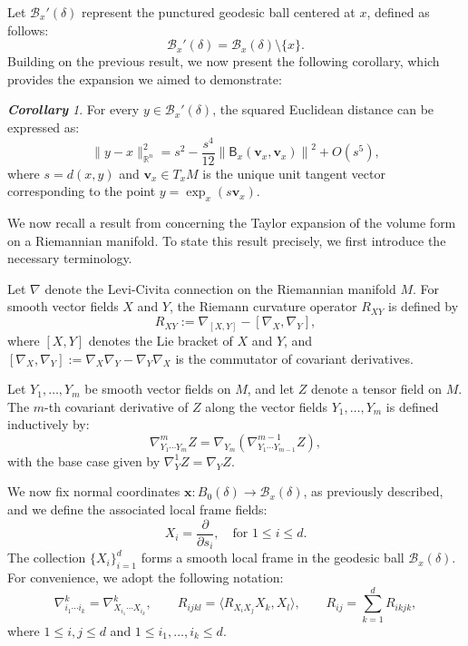 \documentclass{amsart}
\theoremstyle{Theorem}
\theoremstyle{remark}
\newtheorem{cor}{\bf Corollary}[section]
\numberwithin{equation}{section} \numberwithin{figure}{section}
\renewcommand*{\to}{\rightarrow}
\newcommand{\mc}[1]{\mathcal{#1}}
\newcommand{\mf}[1]{\mathbf{#1}}
\begin{document}
Let \( \mathcal{B}_x'(\delta) \) represent the punctured geodesic ball centered at \( x \), defined as follows:
\[
\mathcal{B}_x'(\delta) = \mathcal{B}_x(\delta) \setminus \{x\}.
\]
Building on the previous result, we now present the following corollary, which provides the expansion we aimed to demonstrate:
\begin{cor}
For every \( y \in \mathcal{B}_x'(\delta) \), the squared Euclidean distance can be expressed as:
\[
\| y - x \|_{\mathbb{R}^n}^2 = s^2 - \frac{s^4}{12} \left\| \mathsf{B}_x(\mathbf{v}_x, \mathbf{v}_x) \right\|^2 + O(s^5),
\]
where \( s = d(x, y) \) and \( \mathbf{v}_x \in T_x M \) is the unique unit tangent vector corresponding to the point \( y = \exp_x(s \mathbf{v}_x) \).
\end{cor}



We now recall a result from \cite{AG} concerning the Taylor expansion of the volume form on a Riemannian manifold. To state this result precisely, we first introduce the necessary terminology.

Let \( \nabla \) denote the Levi-Civita connection on the Riemannian manifold \( M \). For smooth vector fields \( X \) and \( Y \), the Riemann curvature operator \( R_{XY} \) is defined by
\[
R_{XY} := \nabla_{[X, Y]} - [\nabla_X, \nabla_Y],
\]
where \( [X, Y] \) denotes the Lie bracket of \( X \) and \( Y \), and \( [\nabla_X, \nabla_Y] := \nabla_X \nabla_Y - \nabla_Y \nabla_X \) is the commutator of covariant derivatives.

Let \( Y_1, \ldots, Y_m \) be smooth vector fields on \( M \), and let \( Z \) denote a tensor field on \( M \). The \( m \)-th covariant derivative of \( Z \) along the vector fields \( Y_1, \ldots, Y_m \) is defined inductively by:
\[
\nabla_{Y_1 \cdots Y_m}^m Z = \nabla_{Y_m} \left( \nabla_{Y_1 \cdots Y_{m-1}}^{m-1} Z \right),
\]
with the base case given by \( \nabla_Y^1 Z = \nabla_Y Z \).

We now fix normal coordinates $\mf x:B_{0}(\delta)\to\mc B_{x}(\delta)$, as previously described, and we define the associated local frame fields:
\[
X_i = \frac{\partial}{\partial s_i}, \quad \text{for } 1 \leq i \leq d.
\]
The collection \( \{X_i\}_{i=1}^d \) forms a smooth local frame in the geodesic ball \( \mathcal{B}_x(\delta) \). For convenience, we adopt the following notation:
\[
\nabla_{i_1 \cdots i_k}^k = \nabla_{X_{i_1} \cdots X_{i_k}}^k, \qquad 
R_{ijkl} = \langle R_{X_i X_j} X_k, X_l \rangle, \qquad 
R_{ij} = \sum_{k=1}^d R_{ikjk},
\]
where \( 1 \leq i, j \leq d \) and \( 1 \leq i_1, \ldots, i_k \leq d \).
\end{document}
